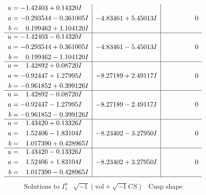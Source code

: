 \documentclass[1p]{elsarticle_modified}
\theoremstyle{definition}
\newcommand{\I}{\sqrt{-1}}
\begin{document}
$$\begin{array}{c|c|c}
\begin{aligned}
u &= -1.42403 + 0.14320 I \\
a &= -0.293544 - 0.361005 I \\
b &= \phantom{-}0.199462 + 1.104120 I\end{aligned}
 & -4.83461 + 5.45013 I & \phantom{-0.000000 } 0 \\ \hline\begin{aligned}
u &= -1.42403 - 0.14320 I \\
a &= -0.293544 + 0.361005 I \\
b &= \phantom{-}0.199462 - 1.104120 I\end{aligned}
 & -4.83461 - 5.45013 I & \phantom{-0.000000 } 0 \\ \hline\begin{aligned}
u &= \phantom{-}1.42892 + 0.08720 I \\
a &= -0.92447 + 1.27995 I \\
b &= -0.961852 + 0.399126 I\end{aligned}
 & -8.27189 + 2.49117 I & \phantom{-0.000000 } 0 \\ \hline\begin{aligned}
u &= \phantom{-}1.42892 - 0.08720 I \\
a &= -0.92447 - 1.27995 I \\
b &= -0.961852 - 0.399126 I\end{aligned}
 & -8.27189 - 2.49117 I & \phantom{-0.000000 } 0 \\ \hline\begin{aligned}
u &= \phantom{-}1.43420 + 0.13326 I \\
a &= \phantom{-}1.52406 - 1.83104 I \\
b &= \phantom{-}1.017390 + 0.428965 I\end{aligned}
 & -8.23402 - 3.27950 I & \phantom{-0.000000 } 0 \\ \hline\begin{aligned}
u &= \phantom{-}1.43420 - 0.13326 I \\
a &= \phantom{-}1.52406 + 1.83104 I \\
b &= \phantom{-}1.017390 - 0.428965 I\end{aligned}
 & -8.23402 + 3.27950 I & \phantom{-0.000000 } 0\\
 \hline 
 \end{array}$$\newpage$$\begin{array}{c|c|c}  
\text{Solutions to }I^u_{1}& \I (\text{vol} + \sqrt{-1}CS) & \text{Cusp shape}\\
 \hline 
\begin{aligned}

\end{aligned}
\end{array}$$
\end{document}
